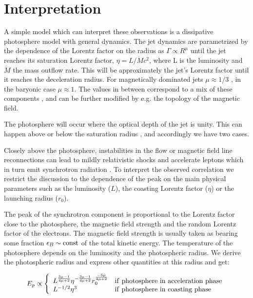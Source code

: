 \section{Interpretation}

A simple model which can interpret these observations is a dissipative
photosphere model \cite{Giannios+07photspec} with general
dynamics. The jet dynamics are parametrized by the dependence of the
Lorentz factor on the radius as $\Gamma\propto R^\mu$ until the jet
reaches its saturation Lorentz factor, $\eta=L/\dot{M}c^2$, where L is
the luminosity and $\dot{M}$ the mass outflow rate. This will be
approximately the jet's Lorentz factor until it reaches the
deceleration radius. For magnetically dominated jets $\mu\approx 1/3$
\cite{Drenkhahn02}, in the baryonic case $\mu\approx1$. The values in
between correspond to a mix of these components \cite{Veres+12fit},
and can be further modified by e.g. the topology of the magnetic
field.

The photosphere will occur where the optical depth of the jet is
unity. This can happen above or below the saturation radius
\cite{Meszaros+93gasdyn}, and accordingly we have two cases.

Closely above the photosphere, instabilities in the flow or magnetic
field line reconnections can lead to mildly relativistic shocks and
accelerate leptons which in turn emit synchrotron radiation
\cite{Meszaros+11gevmag,McKinney+11switch}. To interpret the observed
correlation we restrict the discussion to the dependence of the peak
on the main physical parameters such as the luminosity ($L$), the
coasting Lorentz factor ($\eta$) or the launching radius ($r_0$).

The peak of the synchrotron component is proportional to the Lorentz
factor close to the photosphere, the magnetic field strength and the
random Lorentz factor of the electrons. The magnetic field strength is
usually taken as bearing some fraction $\epsilon_B\sim {\rm const}$ of
the total kinetic energy. The temperature of the photosphere depends
on the luminosity and the photospheric radius.  We derive the
photospheric radius and express other quantities at this radius and
get:


\begin{equation}
E_p \propto \left\{
\begin{array}{ll}
  L^{\frac{3\mu-1}{4\mu+2}} \eta^{-\frac{3\mu-1}{4\mu+2}}
  r_0^{\frac{-5\mu}{4\mu+2}} 		&	{\rm if~photosphere~in~ acceleration~ phase}\\ 
  L^{-1/2} \eta^{3} %
   	&	{\rm if~photosphere~in~  coasting~ phase} 
\end{array}
\right.
\label{eq:ebreak}
\end{equation}


